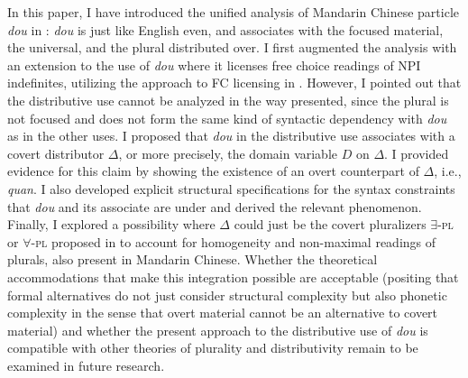 \documentclass[12pt]{article}
\begin{document}
In this paper, I have introduced the unified analysis of Mandarin Chinese particle \emph{dou}  in \citet{liuVarietiesAlternativesMandarin2017,liuPragmaticExplanationMeidou2021}: \emph{dou} is just like English even, and associates with the focused material, the universal, and the plural distributed over. 
I first augmented the analysis with an extension to the use of \emph{dou} where it licenses free choice readings of NPI indefinites, utilizing the approach to FC licensing in \citet{lahiriFocusNegativePolarity1998,crnicNonmonotonicityNPILicensing2014,crnicNumberNPILicensing2022}.
However, I pointed out that the distributive use cannot be analyzed in the way presented, since the plural is not focused and does not form the same kind of syntactic dependency with \emph{dou} as in the other uses.
I proposed that \emph{dou} in the distributive use associates with a covert distributor \(\Delta\), or more precisely, the domain variable \(D\) on \(\Delta\).
I provided evidence for this claim by showing the existence of an overt counterpart of \(\Delta\), i.e., \emph{quan}.
I also developed explicit structural specifications for the syntax constraints that \emph{dou} and its associate are under and derived the relevant phenomenon.
Finally, I explored a possibility where \(\Delta\) could just be the covert pluralizers \(\exists\)-\textsc{pl} or \(\forall\)-\textsc{pl} proposed in \citet{bar-levImplicatureAccountHomogeneity2021} to account for homogeneity and non-maximal readings of plurals, also present in Mandarin Chinese.
Whether the theoretical accommodations that make this integration possible are acceptable (positing that formal alternatives do not just consider structural complexity but also phonetic complexity in the sense that overt material cannot be an alternative to covert material) and whether the present approach to the distributive use of \emph{dou} is compatible with other theories of plurality and distributivity remain to be examined in future research.

\printbibliography
\end{document}
